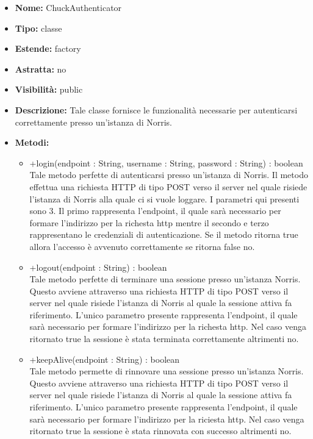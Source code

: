 			
			\begin{itemize}
			\item \textbf{Nome:} ChuckAuthenticator
			\item \textbf{Tipo:} classe
			
		\item \textbf{Estende:}
		factory
		\item \textbf{Astratta:}
		no
			\item \textbf{Visibilità:} public
			\item \textbf{Descrizione:} Tale classe fornisce le funzionalità necessarie per autenticarsi correttamente presso un'istanza di Norris.
			\item \textbf{Metodi:}
				\begin{itemize}
				\setlength{\itemsep}{5pt}
				
					\item[\ding{111}] {{+login(endpoint : String, username : String, password : String) : boolean}} \\ [1mm] Tale metodo perfette di autenticarsi presso un'istanza di Norris. Il metodo effettua una richiesta HTTP di tipo POST verso il server nel quale risiede l'istanza di Norris alla quale ci si vuole loggare. I parametri qui presenti sono 3. Il primo rappresenta l'endpoint, il quale sarà necessario per formare l'indirizzo per la richesta http mentre il secondo e terzo rappresentano le credenziali di autenticazione. Se il metodo ritorna true allora l'accesso è avvenuto correttamente se ritorna false no.
					\item[\ding{111}] {{+logout(endpoint : String) : boolean}} \\ [1mm] Tale metodo perfette di terminare una sessione presso un'istanza Norris. Questo avviene attraverso una richiesta HTTP di tipo POST verso il server nel quale risiede l'istanza di Norris al quale la sessione attiva fa riferimento. L'unico parametro presente rappresenta l'endpoint, il quale sarà necessario per formare l'indirizzo per la richesta http. Nel caso venga ritornato true la sessione è stata terminata correttamente altrimenti no. 
					\item[\ding{111}] {{+keepAlive(endpoint : String) : boolean}} \\ [1mm] Tale metodo permette di rinnovare una sessione presso un'istanza Norris. Questo avviene attraverso una richiesta HTTP di tipo POST verso il server nel quale risiede l'istanza di Norris al quale la sessione attiva fa riferimento. L'unico parametro presente rappresenta l'endpoint, il quale sarà necessario per formare l'indirizzo per la riciesta http. Nel caso venga ritornato true la sessione è stata rinnovata con successo altrimenti no. 
				\end{itemize}
		
			\end{itemize}

